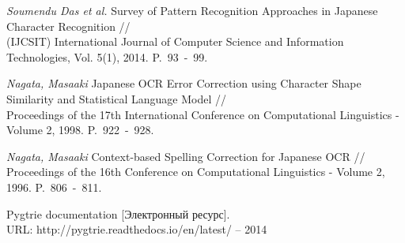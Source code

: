 \documentclass[14pt,russian]{extreport}
\theoremstyle{definition}
\begin{document}
\newpage
{}
\begin{thebibliography}{00}
	
\textit{Soumendu Das et al.} Survey of Pattern Recognition Approaches in Japanese Character Recognition //\\
(IJCSIT) International Journal of Computer Science and Information Technologies, Vol. 5(1), 2014. P.~93~-~99.

\textit{Nagata, Masaaki} Japanese OCR Error Correction using Character Shape Similarity and Statistical Language Model //\\
Proceedings of the 17th International Conference on Computational Linguistics - Volume 2, 1998. P.~922~-~928.

\textit{Nagata, Masaaki} Context-based Spelling Correction for Japanese OCR //\\
Proceedings of the 16th Conference on Computational Linguistics - Volume 2, 1996. P.~806~-~811.

 Pygtrie documentation [Электронный ресурс]. \\ URL: http://pygtrie.readthedocs.io/en/latest/ -- 2014

\end{thebibliography}
\end{document}
